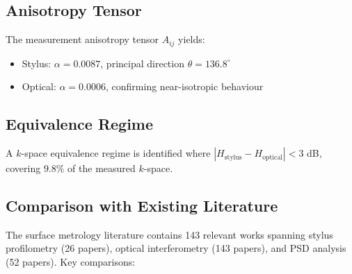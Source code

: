 \documentclass[review]{elsarticle}
\begin{document}
\subsection{Anisotropy Tensor}

The measurement anisotropy tensor $A_{ij}$ yields:
\begin{itemize}
    \item Stylus: $\alpha = 0.0087$, principal direction $\theta = 136.8^\circ$
    \item Optical: $\alpha = 0.0006$, confirming near-isotropic behaviour
\end{itemize}

\subsection{Equivalence Regime}

A $k$-space equivalence regime is identified where $|H_\mathrm{stylus} - H_\mathrm{optical}| < 3$ dB,
covering $9.8\%$ of the
measured $k$-space.


\subsection{Comparison with Existing Literature}

The surface metrology literature contains 143 relevant works spanning
stylus profilometry (26 papers), optical interferometry (143 papers),
and PSD analysis (52 papers). Key comparisons:
\end{document}
